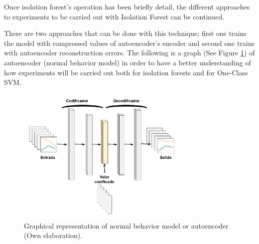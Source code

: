 Once isolation forest's operation has been briefly detail, the different approaches to experiments to be carried out with Isolation Forest can be continued.

\vspace{5mm} %

There are two approaches that can be done with this technique; first one trains the model with compressed values of autoencoder's encoder and second one trains with autoencoder reconstruction errors. The following is a graph (See Figure \ref{fig:autoencoder}) of autoencoder (normal behavior model) in order to have a better understanding of how experiments will be carried out both for isolation forests and for One-Class SVM.

\begin{figure}[H]
        \centering
            \includegraphics[width=0.75\textwidth, frame]{imagenes/Cap5/autoencoder}
        \caption{Graphical representation of normal behavior model or autoencoder (Own elaboration).}
		\label{fig:autoencoder}
\end{figure}

